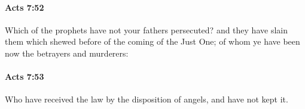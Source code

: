 		\paragraph{Acts 7:52} %
			\label{ACTS-7-52}

			Which of the prophets have not your fathers persecuted?  and they have slain them which shewed before of the coming of the Just One; of whom ye have been now the betrayers and murderers:

			\begin{framed}
			\scriptsize
				\begin{compactdesc}
					\item[SBLG] 
				\end{compactdesc}
			\end{framed}

		\paragraph{Acts 7:53} %
			\label{ACTS-7-53}

			Who have received the law by the disposition of angels, and have not kept it.

